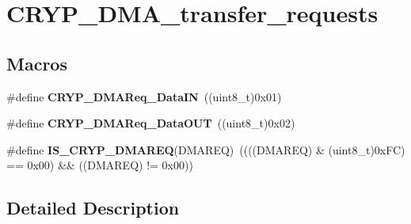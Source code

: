 \hypertarget{group___c_r_y_p___d_m_a__transfer__requests}{\section{C\-R\-Y\-P\-\_\-\-D\-M\-A\-\_\-transfer\-\_\-requests}
\label{group___c_r_y_p___d_m_a__transfer__requests}
}
\subsection*{Macros}
\begin{DoxyCompactItemize}
\item 
\hypertarget{group___c_r_y_p___d_m_a__transfer__requests_gae524983ae7dc12d0f91e73bac4dda8e9}{\#define {\bfseries C\-R\-Y\-P\-\_\-\-D\-M\-A\-Req\-\_\-\-Data\-I\-N}~((uint8\-\_\-t)0x01)}\label{group___c_r_y_p___d_m_a__transfer__requests_gae524983ae7dc12d0f91e73bac4dda8e9}

\item 
\hypertarget{group___c_r_y_p___d_m_a__transfer__requests_ga35ef833d8049278f5381681892a35df0}{\#define {\bfseries C\-R\-Y\-P\-\_\-\-D\-M\-A\-Req\-\_\-\-Data\-O\-U\-T}~((uint8\-\_\-t)0x02)}\label{group___c_r_y_p___d_m_a__transfer__requests_ga35ef833d8049278f5381681892a35df0}

\item 
\hypertarget{group___c_r_y_p___d_m_a__transfer__requests_gaa382c78dd1657a151827830d946df578}{\#define {\bfseries I\-S\-\_\-\-C\-R\-Y\-P\-\_\-\-D\-M\-A\-R\-E\-Q}(D\-M\-A\-R\-E\-Q)~((((D\-M\-A\-R\-E\-Q) \& (uint8\-\_\-t)0x\-F\-C) == 0x00) \&\& ((\-D\-M\-A\-R\-E\-Q) != 0x00))}\label{group___c_r_y_p___d_m_a__transfer__requests_gaa382c78dd1657a151827830d946df578}

\end{DoxyCompactItemize}


\subsection{Detailed Description}
